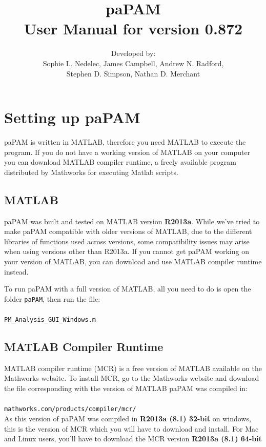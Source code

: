 \documentclass[11pt]{report}
\title{paPAM \\ \Large User Manual for version 0.872}
\author{Developed by:\\ Sophie L. Nedelec, James Campbell, Andrew N. Radford,\\Stephen D. Simpson, Nathan D. Merchant}
\begin{document}
\maketitle

\tableofcontents

\chapter{Setting up paPAM} \label{SettingUppaPAM}

paPAM is written in MATLAB, therefore you need MATLAB to execute the program.  If you do not have a working version of MATLAB on your computer you can download MATLAB compiler runtime, a freely available program distributed by Mathworks for executing Matlab scripts.

\section{MATLAB}
paPAM was built and tested on MATLAB version \textbf{R2013a}.  While we've tried to make paPAM compatible with older versions of MATLAB, due to the different libraries of functions used across versions, some compatibility issues may arise when using versions other than R2013a.  If you cannot get paPAM working on your version of MATLAB, you can download and use MATLAB compiler runtime instead.

To run paPAM with a full version of MATLAB, all you need to do is open the folder \texttt{paPAM}, then run the file:\\\\ \texttt{PM\_Analysis\_GUI\_Windows.m}

\section{MATLAB Compiler Runtime} 

MATLAB compiler runtime (MCR) is a free version of MATLAB available on the Mathworks website.  To install MCR, go to the Mathworks website and download the file corresponding with the version of MATLAB paPAM was compiled in:\\\\
\texttt{mathworks.com/products/compiler/mcr/}\\

As this version of paPAM was compiled in \textbf{R2013a (8.1) 32-bit} on windows, this is the version of MCR which you will have to download and install.  For Mac and Linux users, you'll have to download the MCR version \textbf{R2013a (8.1) 64-bit}
\end{document}
